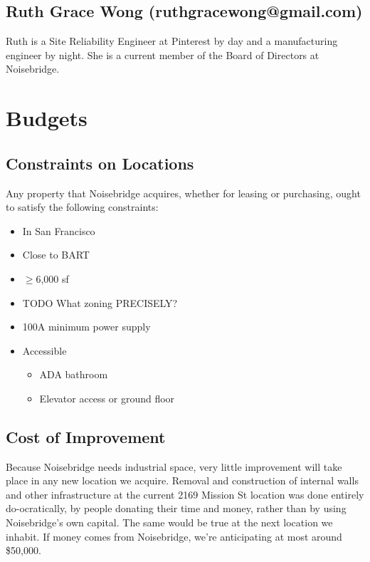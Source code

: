 \documentclass[12pt]{article}
\begin{document}
\subsection{Ruth Grace Wong (ruthgracewong@gmail.com)} Ruth is a Site Reliability Engineer at Pinterest by day and a manufacturing engineer by night. She is a current member of the Board of Directors at Noisebridge.

\section{Budgets}

\subsection{Constraints on Locations}

Any property that Noisebridge acquires, whether for leasing or purchasing, ought to satisfy the following constraints:

\begin{itemize}
    \item In San Francisco
    \item Close to BART
    \item $\geq$6,000 sf
    \item TODO What zoning PRECISELY?
    \item 100A minimum power supply
    \item Accessible
        \begin{itemize}
            \item ADA bathroom
            \item Elevator access or ground floor
        \end{itemize}
\end{itemize}



\subsection{Cost of Improvement}

Because Noisebridge needs industrial space, very little improvement will take place in any new location we acquire. Removal and construction of internal walls and other infrastructure at the current 2169 Mission St location was done entirely do-ocratically, by people donating their time and money, rather than by using Noisebridge's own capital. The same would be true at the next location we inhabit. If money comes from Noisebridge, we're anticipating at most around \$50,000.
\end{document}
